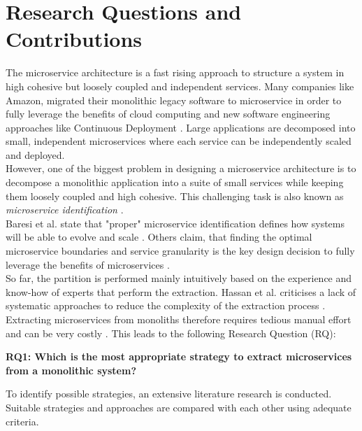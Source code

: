 \section{Research Questions and Contributions}
\label{sec:Introduction:ResearchQuestions}
The microservice architecture is a fast rising approach to structure a system in high cohesive but loosely coupled and independent services. Many companies like Amazon, migrated their monolithic legacy software to microservice in order to fully leverage the benefits of cloud computing and new software engineering approaches like Continuous Deployment \cite{MigratingCloud}. Large applications are decomposed into small, independent microservices where each service can be independently scaled and deployed. 
\\
However, one of the biggest problem in designing a microservice architecture is to decompose a monolithic application into a suite of small services while keeping them loosely coupled and high cohesive. This challenging task is also known as \textit{microservice identification} \cite{ObjectAwareAmiri}. \\
Baresi et al. state that "proper" microservice identification defines how systems will be able to evolve and scale \cite{interfaceAnalysisBaresi}. Others claim, that finding the optimal microservice boundaries and service granularity is the key design decision to fully leverage the benefits of microservices \cite{ClassificationOfRefactoring} \cite{ArchitecturalMetaModelling}. 
\\
So far, the partition is performed mainly intuitively based on the experience and know-how of experts that perform the extraction. Hassan et al. criticises a lack of systematic approaches to reduce the complexity of the extraction process \cite{ArchitecturalMetaModelling}. Extracting microservices from monoliths therefore requires tedious manual effort and can be very costly \cite{FunctionalDecompositionHeinrich} \cite{ExtractionMazlami}. This leads to the following Research Question (RQ):

\vspace{1cm}
\par
\begingroup
\leftskip=1cm
\rightskip=1cm


\noindent
\textbf{RQ1: Which is the most appropriate strategy to extract microservices from a monolithic  
	system?}

\vspace{0.5cm}
\noindent
To identify possible strategies, an extensive literature research is conducted. Suitable strategies and approaches are compared with each other using adequate criteria. 
\vspace{0.5cm}

